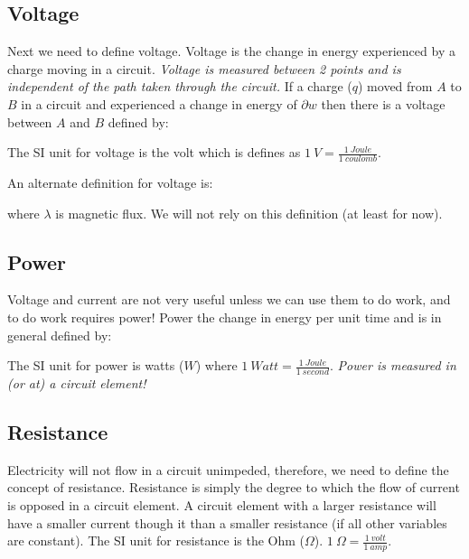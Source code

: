 \documentclass{handout}
\begin{document}
\subsection{Voltage}
Next we need to define voltage.  Voltage is the change in energy experienced by a charge moving in a circuit. {\em Voltage is measured between 2 points and is independent of the path taken through the circuit. }
If a charge ($q$) moved from $A$ to $B$ in a circuit and experienced a change in energy of $\partial w$ then there is a voltage between $A$ and $B$ defined by:

The SI unit for voltage is the volt which is defines as $1\ V = \frac{1\ Joule}{1\ coulomb}$.

An alternate definition for voltage is:

where $\lambda$ is magnetic flux.  We will not rely on this definition (at least for now).

\subsection{Power}
Voltage and current are not very useful unless we can use them to do work, and to do work requires power!  Power the change in energy per unit time and is in general defined by:

The SI unit for power is watts ($W$) where $1\ Watt = \frac{1\ Joule}{1\ second}$. {\em Power is measured in (or at) a circuit element!}

\subsection{Resistance}
Electricity will not flow in a circuit unimpeded, therefore, we need to define the concept of resistance.  Resistance is simply the degree to which the flow of current is opposed in a circuit element.  A circuit element with a larger resistance will have a smaller current though it than a smaller resistance (if all other variables are constant).  The SI unit for resistance is the Ohm ($\Omega$).  $1 \ \Omega = \frac{1\ volt}{1\ amp}$.
\end{document}
